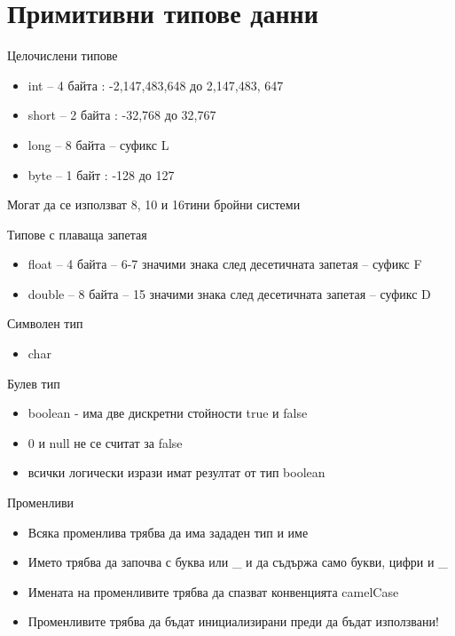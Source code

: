 \documentclass{beamer}
\begin{document}
\section{Примитивни типове данни}


\begin{frame}{Целочислени типове}
  \begin{itemize}
  \item int – 4 байта : -2,147,483,648 до
    2,147,483, 647
  \item short – 2 байта : -32,768 до 32,767
  \item long – 8 байта – суфикс L
  \item byte – 1 байт : -128 до 127
  \end{itemize}

  Могат да се използват 8, 10 и 16тини
  бройни системи
\end{frame}


\begin{frame}{Типове с плаваща запетая}
  \begin{itemize}
  \item   float – 4 байта – 6-7 значими знака след
    десетичната запетая – суфикс F
    \item double – 8 байта – 15 значими знака
    след десетичната запетая – суфикс D
  \end{itemize}
\end{frame}


\begin{frame}{Символен тип}
  \begin{itemize}
  \item char
  \end{itemize}
\end{frame}


\begin{frame}{Булев тип}
  \begin{itemize}
  \item boolean - има две дискретни стойности true и false
  \item 0 и null не се считат за false
  \item всички логически изрази имат резултат от тип boolean
  \end{itemize}
\end{frame}


\begin{frame}{Променливи}
  \begin{itemize}
  \item Всяка променлива трябва да има
    зададен тип и име

  \item Името трябва да започва с буква или \_
    и да съдържа само букви, цифри и \_

  \item Имената на променливите трябва да спазват конвенцията camelCase
  
  \item Променливите трябва да бъдат инициализирани преди да бъдат използвани!
  \end{itemize}
\end{frame}
\end{document}
